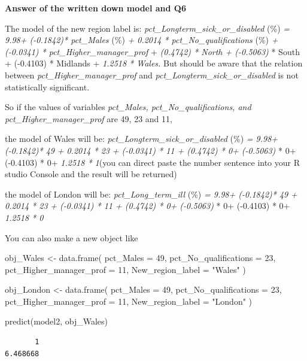 \documentclass[
  letterpaper,
  DIV=11,
  numbers=noendperiod]{scrreprt}
\newenvironment{Shaded}{\begin{snugshade}}{\end{snugshade}}
\newcommand{\AttributeTok}[1]{\textcolor[rgb]{0.40,0.45,0.13}{#1}}
\newcommand{\DecValTok}[1]{\textcolor[rgb]{0.68,0.00,0.00}{#1}}
\newcommand{\FunctionTok}[1]{\textcolor[rgb]{0.28,0.35,0.67}{#1}}
\newcommand{\NormalTok}[1]{\textcolor[rgb]{0.00,0.23,0.31}{#1}}
\newcommand{\OtherTok}[1]{\textcolor[rgb]{0.00,0.23,0.31}{#1}}
\newcommand{\StringTok}[1]{\textcolor[rgb]{0.13,0.47,0.30}{#1}}
\begin{document}
\textbf{Answer of the written down model and Q6}

The model of the new region label is:
\emph{pct\_Longterm\_sick\_or\_disabled} (\%) \emph{= 9.98+ (-0.1842)*
pct\_Males} (\%) \emph{+ 0.2014 * pct\_No\_qualifications} (\%) \emph{+
(-0.0341) * pct\_Higher\_manager\_prof} + \emph{(0.4742) * North +
(-0.5063)} * South + (-0.4103) * Midlands + \emph{1.2518 * Wales.} But
should be aware that the relation between
\emph{pct\_Higher\_manager\_prof} and
\emph{pct\_Longterm\_sick\_or\_disabled} is not statistically
significant.

So if the values of variables \emph{pct\_Males, pct\_No\_qualifications,
and pct\_Higher\_manager\_prof} are 49, 23 and 11,

the model of Wales will be: \emph{pct\_Longterm\_sick\_or\_disabled}
(\%) \emph{= 9.98+ (-0.1842)* 49} \emph{+ 0.2014 * 23} \emph{+ (-0.0341)
* 11 + (0.4742) * 0+ (-0.5063)} * 0+ (-0.4103) * 0+ \emph{1.2518 *
1}(you can direct paste the number sentence into your R studio Console
and the result will be returned)

the model of London will be: \emph{pct\_Long\_term\_ill} (\%) \emph{=
9.98+ (-0.1842)* 49} \emph{+ 0.2014 * 23} \emph{+ (-0.0341) * 11 +
(0.4742) * 0+ (-0.5063)} * 0+ (-0.4103) * 0+ \emph{1.2518 * 0}

You can also make a new object like

\begin{Shaded}
\begin{Highlighting}[]
\NormalTok{obj\_Wales }\OtherTok{\textless{}{-}} \FunctionTok{data.frame}\NormalTok{(}
  \AttributeTok{pct\_Males =} \DecValTok{49}\NormalTok{,}
  \AttributeTok{pct\_No\_qualifications =} \DecValTok{23}\NormalTok{,}
  \AttributeTok{pct\_Higher\_manager\_prof =} \DecValTok{11}\NormalTok{,}
  \AttributeTok{New\_region\_label =} \StringTok{"Wales"}
\NormalTok{)}

\NormalTok{obj\_London }\OtherTok{\textless{}{-}} \FunctionTok{data.frame}\NormalTok{(}
  \AttributeTok{pct\_Males =} \DecValTok{49}\NormalTok{,}
  \AttributeTok{pct\_No\_qualifications =} \DecValTok{23}\NormalTok{,}
  \AttributeTok{pct\_Higher\_manager\_prof =} \DecValTok{11}\NormalTok{,}
  \AttributeTok{New\_region\_label =} \StringTok{"London"}
\NormalTok{)}

\FunctionTok{predict}\NormalTok{(model2, obj\_Wales)}
\end{Highlighting}
\end{Shaded}

\begin{verbatim}
       1 
6.468668 
\end{verbatim}
\end{document}
